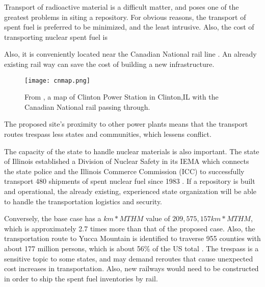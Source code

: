 


Transport of radioactive material is a difficult matter, and poses one of the greatest
problems in siting a repository. For obvious reasons, the transport of spent fuel
is preferred to be minimized, and the least intrusive. Also, the cost of transporting
nuclear spent fuel is 

Also, it is conveniently located near the Canadian National rail line \cite{waleed_regional_2015}. An already existing rail way can
save the cost of building a new infrastructure.

\begin{figure}[!h] 
  \centering
  \texttt{[image: cnmap.png]}	
        \caption{From \cite{CN-national}, a map of Clinton Power Station in Clinton,IL
        with the Canadian National rail passing through.}
  \label{fig:cnmap.png}
\end{figure}

The proposed site's proximity to other power plants means that the transport
routes trespass less states and communities, which lessens conflict.

The capacity of the state to handle nuclear materials is also important.
The state of Illinois established a Division of Nuclear Safety in its \gls{IEMA}
which connects the state police and the Illinois Commerce Commission (ICC) to
 successfully transport 480 shipments of spent nuclear fuel since 1983
 \cite{IMEA}. If a repository is built and operational, the already existing,
 experienced state organization will be able to handle the transportation logistics
 and security.  

Conversely, the base case has a $km*MTHM$ value of $209,575,157 km*MTHM$, 
which is approximately 2.7 times more than that of the proposed case. Also, the 
transportation route to Yucca Mountain is identified to traverse 955 counties
with about 177 million persons, which is about 56\% of the US total
 \cite{Dilger_2015}. The trespass is a sensitive topic to some states, and may
 demand reroutes that cause unexpected cost increases in transportation. Also,
 new railways would need to be constructed in order to ship the spent fuel inventories
 by rail. 


